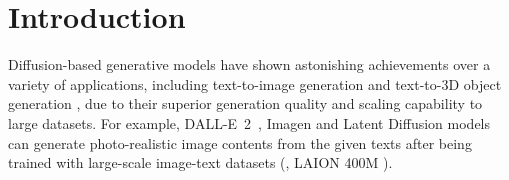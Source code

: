 \documentclass[10pt,twocolumn,letterpaper]{article}
\begin{document}
\section{Introduction}
\label{sec:intro}

Diffusion-based generative models have shown astonishing achievements over a variety of applications, including text-to-image generation \cite{imagen, dalle2,rombach_high-resolution_2022} and text-to-3D object generation \cite{poole2022dreamfusion}, 
due to their superior generation quality and scaling capability to large datasets.   For example, \mbox{DALL-E 2}~\cite{dalle2}, Imagen \cite{imagen} and Latent  Diffusion \cite{rombach_high-resolution_2022} models
can generate photo-realistic image contents from the given texts after being trained with large-scale image-text datasets (\eg, LAION 400M \cite{laion5b}).
\end{document}
